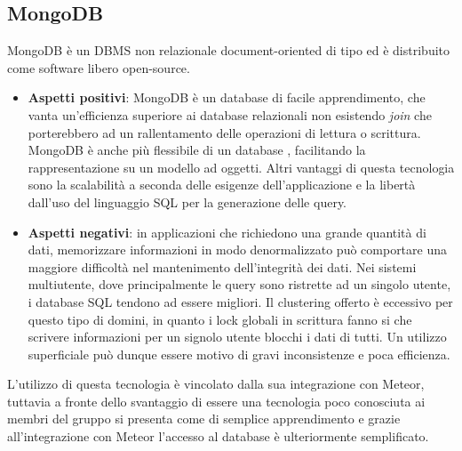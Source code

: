 \subsection{MongoDB}
MongoDB è un DBMS non relazionale document-oriented di tipo  ed è distribuito come software libero open-source. 
\begin{itemize}
	\item \textbf{Aspetti positivi}: MongoDB è un database di facile apprendimento, che vanta un'efficienza superiore ai database relazionali non esistendo \textit{join} che porterebbero ad un rallentamento delle operazioni di lettura o scrittura. MongoDB è anche più flessibile di un database , facilitando la rappresentazione su un modello ad oggetti. Altri vantaggi di questa tecnologia sono la scalabilità a seconda delle esigenze dell'applicazione e la libertà dall'uso del linguaggio SQL per la generazione delle query.
	\item \textbf{Aspetti negativi}: in applicazioni che richiedono una grande quantità di dati, memorizzare informazioni in modo denormalizzato può comportare una maggiore difficoltà nel mantenimento dell'integrità dei dati. Nei sistemi multiutente, dove principalmente le query sono ristrette ad un singolo utente, i database SQL tendono ad essere migliori. Il clustering offerto è eccessivo per questo tipo di domini, in quanto i lock globali in scrittura fanno si che scrivere informazioni per un signolo utente blocchi i dati di tutti. Un utilizzo superficiale può dunque essere motivo di gravi inconsistenze e poca efficienza.
\end{itemize}
L'utilizzo di questa tecnologia è vincolato dalla sua integrazione con Meteor, tuttavia a fronte dello svantaggio di essere una tecnologia poco conosciuta ai membri del gruppo si presenta come di semplice apprendimento e grazie all'integrazione con Meteor l'accesso al database è ulteriormente semplificato.

